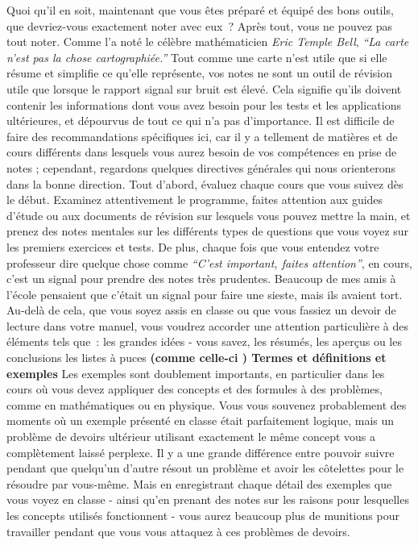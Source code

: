 Quoi qu'il en soit, maintenant que vous êtes préparé et équipé des bons
outils, que devriez-vous exactement noter avec eux~? Après tout, vous ne
pouvez pas tout noter. Comme l'a noté le célèbre mathématicien
\emph{Eric Temple Bell}, \emph{``La carte n'est pas la chose
cartographiée.''} Tout comme une carte n'est utile que si elle résume et
simplifie ce qu'elle représente, vos notes ne sont un outil de révision
utile que lorsque le rapport signal sur bruit est élevé. Cela signifie
qu'ils doivent contenir les informations dont vous avez besoin pour les
tests et les applications ultérieures, et dépourvus de tout ce qui n'a
pas d'importance. Il est difficile de faire des recommandations
spécifiques ici, car il y a tellement de matières et de cours différents
dans lesquels vous aurez besoin de vos compétences en prise de notes ;
cependant, regardons quelques directives générales qui nous orienterons
dans la bonne direction. Tout d'abord, évaluez chaque cours que vous
suivez dès le début. Examinez attentivement le programme, faites
attention aux guides d'étude ou aux documents de révision sur lesquels
vous pouvez mettre la main, et prenez des notes mentales sur les
différents types de questions que vous voyez sur les premiers exercices
et tests. De plus, chaque fois que vous entendez votre professeur dire
quelque chose comme \emph{``C'est important, faites attention''}, en
cours, c'est un signal pour prendre des notes très prudentes. Beaucoup
de mes amis à l'école pensaient que c'était un signal pour faire une
sieste, mais ils avaient tort. Au-delà de cela, que vous soyez assis en
classe ou que vous fassiez un devoir de lecture dans votre manuel, vous
voudrez accorder une attention particulière à des éléments tels que~:
les grandes idées - vous savez, les résumés, les aperçus ou les
conclusions les listes à puces \textbf{(comme celle-ci ) Termes et
définitions et exemples} Les exemples sont doublement importants, en
particulier dans les cours où vous devez appliquer des concepts et des
formules à des problèmes, comme en mathématiques ou en physique. Vous
vous souvenez probablement des moments où un exemple présenté en classe
était parfaitement logique, mais un problème de devoirs ultérieur
utilisant exactement le même concept vous a complètement laissé
perplexe. Il y a une grande différence entre pouvoir suivre pendant que
quelqu'un d'autre résout un problème et avoir les côtelettes pour le
résoudre par vous-même. Mais en enregistrant chaque détail des exemples
que vous voyez en classe - ainsi qu'en prenant des notes sur les raisons
pour lesquelles les concepts utilisés fonctionnent - vous aurez beaucoup
plus de munitions pour travailler pendant que vous vous attaquez à ces
problèmes de devoirs.

